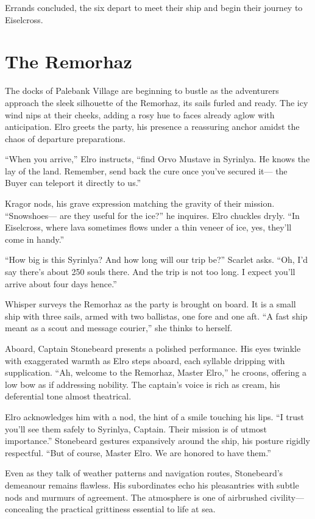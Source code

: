\documentclass[
  letterpaper,12pt,twoside,twocolumn,openany,
  nodeprecatedcode,bg=full]{dndbook}
\begin{document}
Errands concluded, the six depart to meet their ship and begin their
journey to Eiselcross.

\section{The Remorhaz}\label{the-remorhaz}

The docks of Palebank Village are beginning to bustle as the adventurers
approach the sleek silhouette of the Remorhaz, its sails furled and
ready. The icy wind nips at their cheeks, adding a rosy hue to faces
already aglow with anticipation. Elro greets the party, his presence a
reassuring anchor amidst the chaos of departure preparations.

``When you arrive,'' Elro instructs, ``find Orvo Mustave in Syrinlya. He
knows the lay of the land. Remember, send back the cure once you've
secured it--- the Buyer can teleport it directly to us.''

Kragor nods, his grave expression matching the gravity of their mission.
``Snowshoes--- are they useful for the ice?'' he inquires. Elro chuckles
dryly. ``In Eiselcross, where lava sometimes flows under a thin veneer
of ice, yes, they'll come in handy.''

``How big is this Syrinlya? And how long will our trip be?'' Scarlet
asks. ``Oh, I'd say there's about 250 souls there. And the trip is not
too long. I expect you'll arrive about four days hence.''

Whisper surveys the Remorhaz as the party is brought on board. It is a
small ship with three sails, armed with two ballistas, one fore and one
aft. ``A fast ship meant as a scout and message courier,'' she thinks to
herself.

Aboard, Captain Stonebeard presents a polished performance. His eyes
twinkle with exaggerated warmth as Elro steps aboard, each syllable
dripping with supplication. ``Ah, welcome to the Remorhaz, Master
Elro,'' he croons, offering a low bow as if addressing nobility. The
captain's voice is rich as cream, his deferential tone almost
theatrical.

Elro acknowledges him with a nod, the hint of a smile touching his lips.
``I trust you'll see them safely to Syrinlya, Captain. Their mission is
of utmost importance.'' Stonebeard gestures expansively around the ship,
his posture rigidly respectful. ``But of course, Master Elro. We are
honored to have them.''

Even as they talk of weather patterns and navigation routes,
Stonebeard's demeanour remains flawless. His subordinates echo his
pleasantries with subtle nods and murmurs of agreement. The atmosphere
is one of airbrushed civility--- concealing the practical grittiness
essential to life at sea.
\end{document}
